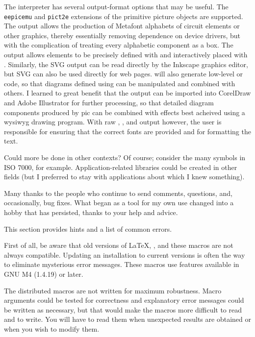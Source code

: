 The \dpic interpreter has several output-format options that may be
useful.  The {\tt eepicemu} and {\tt pict2e} extensions of the
primitive \latex picture objects are supported.  The \mfpic output
allows the production of Metafont alphabets of circuit elements or
other graphics, thereby essentially removing dependence on device
drivers, but with the complication of treating every alphabetic
component as a \tex box.  The \xfig output allows elements to be
precisely defined with \dpic  and interactively placed with \xfig.
Similarly, the SVG output can be read directly by the Inkscape graphics
editor, but SVG can also be used directly for web pages.
\Dpic will also generate low-level \MetaPost or \Postscript code, so
that diagrams defined using \pic can be manipulated and combined with
others.
I learned to great benefit that the \Postscript output can be imported
into CorelDraw and Adobe Illustrator for further processing, so that
detailed diagram components produced by pic can be combined
with effects best acheived using a wysiwyg drawing program.  With raw
\Postscript, \PDF, and \SVG output however, the user is responsible for
ensuring that the correct fonts are provided and for formatting the text.

Could more be done in other contexts? Of course; consider the many
symbols in ISO 7000, for example. Application-related libraries could
be created in other fields (but I preferred to stay with applications
about which I knew something).

Many thanks to the people who continue to send comments, questions,
and, occasionally, bug fixes. What began as a tool for my own use changed
into a hobby that has persisted, thanks to your help and advice.

This section provides hints and a list of common errors.

First of all, be aware that old versions of \LaTeX, \dpic, and these
macros are not always compatible.  Updating an installation to current
versions is often the way to eliminate mysterious error messages.
These macros use features available in GNU M4 (1.4.19) or later.

The distributed macros are not written for maximum robustness.
Macro arguments could be tested for correctness and
explanatory error messages could be written as necessary, but that
would make the macros more difficult to read and to write.  You will
have to read them when unexpected results are obtained or when you wish
to modify them.

